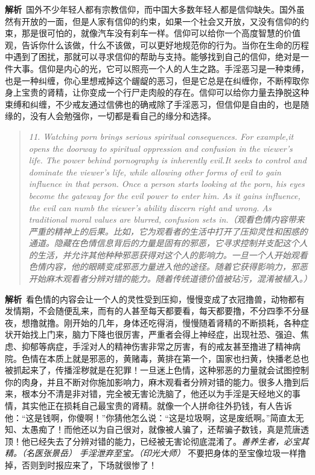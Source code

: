 \textbf{解析}\ 国外不少年轻人都有宗教信仰，而中国大多数年轻人都是信仰缺失。国外虽然有开放的一面，但是人家有信仰的约束，如果一个社会又开放，又没有信仰的约束，那是很可怕的，就像汽车没有刹车一样。信仰可以给你一个高度智慧的价值观，告诉你什么该做，什么不该做，可以更好地规范你的行为。当你在生命的历程中遇到了困扰，那就可以寻求信仰的帮助与支持。能够找到自己的信仰，绝对是一件大事。信仰是内心的光，它可以照亮一个人的人生之路。手淫恶习是一种束缚，也是一种纠缠，你心里想戒掉这个龌龊的恶习，但是它总是在纠缠你，不断榨取你身上宝贵的肾精，让你变成一个行尸走肉般的存在。信仰可以给你力量去挣脱这种束缚和纠缠，不少戒友通过信佛也的确戒除了手淫恶习，但信仰是自由的，也是随缘的，没有人会勉强你，一切都是看自己的缘分和选择。

\begin{quote}\it
    11. Watching porn brings serious spiritual consequences. For example,it opens the doorway to spiritual oppression and confusion in the viewer's life. The power behind pornography is inherently evil.It seeks to control and dominate the viewer's life, while allowing other forms of evil to gain influence in that person. Once a person starts looking at the porn, his eyes become the gateway for the evil power to enter him. As it gains influence, the evil can numb the viewer's ability discern right and wrong. As traditional moral values are blurred, confusion sets in.（观看色情内容带来严重的精神上的后果。比如，它为观看者的生活中打开了压抑灵性和困惑的通道。隐藏在色情信息背后的力量是固有的邪恶，它寻求控制并支配这个人的生活，并允许其他种种邪恶获得对这个人的影响力。一旦一个人开始观看色情内容，他的眼睛变成邪恶力量进入他的途径。随着它获得影响力，邪恶开始麻木观看者分辨对错的能力。随着传统道德价值被玷污，混淆被植入。）
\end{quote}

\textbf{解析}\ 看色情的内容会让一个人的灵性受到压抑，慢慢变成了衣冠撸兽，动物都有发情期，不会随便乱来，而有的人甚至每天都要看，每天都要撸，不分四季不分昼夜，想撸就撸。刚开始的几年，身体还吃得消，慢慢随着肾精的不断损耗，各种症状开始找上门来，脑力下降也很厉害，严重者会得上神经症，出现社恐、强迫、焦虑、抑郁等病症，手淫对人的精神伤害非常之厉害，有的戒友甚至撸进了精神病院。色情在本质上就是邪恶的，黄赌毒，黄排在第一个，国家也扫黄，快播老总也被抓起来了，传播淫秽就是在犯罪！一旦迷上色情，这种邪恶的力量就会试图控制你的肉身，并且不断对你施加影响力，麻木观看者分辨对错的能力。很多人撸到后来，根本分不清是非对错，完全被无害论洗脑了，他还以为手淫是天经地义的事情，其实他正在损耗自己最宝贵的肾精。就像一个人拼命往外扔钱，有人告诉他：“这是钱啊，你傻啊！”你猜他怎么说：“这是垃圾啊，这是废纸啊。”简直太无知、太愚痴了！而他还以为自己很对，就像被人骗了，还帮骗子数钱，真是荒唐透顶！他已经失去了分辨对错的能力，已经被无害论彻底混淆了。\textit{善养生者，必宝其精。（名医张景岳）} \textit{手淫泄弃至宝。（印光大师）} 不要把身体的至宝像垃圾一样撸掉，否则到时报应来了，下场就很惨了！

